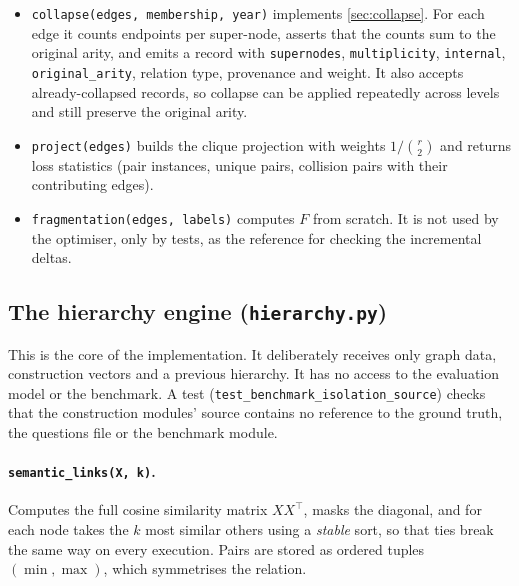 \documentclass[11pt,a4paper]{article}
\newcommand{\cref}[1]{\autoref{#1}}
\theoremstyle{remark}
\newcommand{\code}[1]{\texttt{\small #1}}
\begin{document}
\begin{itemize}
  \item \code{collapse(edges, membership, year)} implements \cref{sec:collapse}. For each
        edge it counts endpoints per super-node, asserts that the counts sum to the
        original arity, and emits a record with \code{supernodes}, \code{multiplicity},
        \code{internal}, \code{original\_arity}, relation type, provenance and weight. It
        also accepts already-collapsed records, so collapse can be applied repeatedly
        across levels and still preserve the original arity.
  \item \code{project(edges)} builds the clique projection with weights $1/\binom r2$ and
        returns loss statistics (pair instances, unique pairs, collision pairs with their
        contributing edges).
  \item \code{fragmentation(edges, labels)} computes $F$ from scratch. It is not used by the
        optimiser, only by tests, as the reference for checking the incremental deltas.
\end{itemize}

\subsection{The hierarchy engine (\code{hierarchy.py})}

This is the core of the implementation. It deliberately receives only graph data,
construction vectors and a previous hierarchy. It has no access to the evaluation model or
the benchmark. A test (\code{test\_benchmark\_isolation\_source}) checks that the construction
modules' source contains no reference to the ground truth, the questions file or the benchmark
module.

\paragraph{\code{semantic\_links(X, k)}.}
Computes the full cosine similarity matrix $XX^\top$, masks the diagonal, and for each node
takes the $k$ most similar others using a \emph{stable} sort, so that ties break the same
way on every execution. Pairs are stored as ordered tuples $(\min,\max)$, which
symmetrises the relation.
\end{document}
